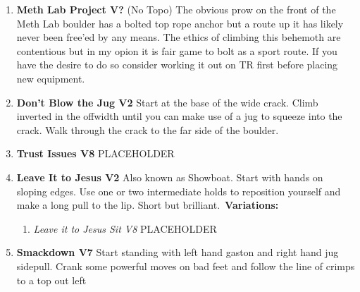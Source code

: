 \label{pt:Octurnal}
\begin{enumerate}[]
	\setcounter{enumi}{0}
	\item\label{rt:Meth Lab Project} \colorbox{black!20}{\textbf{Meth Lab Project V?  \warn \warn \warn } }
	\newline (No Topo) 
	\newline The obvious prow on the front of the Meth Lab boulder has a bolted top rope anchor but a route up it has likely never been free'ed by any means. The ethics of climbing this behemoth are contentious but in my opion it is fair game to bolt as a sport route. If you have the desire to do so consider working it out on TR first before placing new equipment.\
	\setcounter{enumi}{1}
	\item\label{rt:Don't Blow the Jug} \colorbox{green!20}{\textbf{Don't Blow the Jug V2    \warn } }
	\newline Start at the base of the wide crack. Climb inverted in the offwidth until you can make use of a jug to squeeze into the crack. Walk through the crack to the far side of the boulder.\
	\setcounter{enumi}{2}
	\item\label{rt:Trust Issues} \colorbox{Goldenrod!50}{\textbf{Trust Issues V8  \warn \warn } }
	\newline PLACEHOLDER\
	\setcounter{enumi}{3}
	\item\label{rt:Leave It to Jesus} \colorbox{green!20}{\textbf{Leave It to Jesus V2     } }
	\newline Also known as Showboat. Start with hands on sloping edges. Use one or two intermediate holds to reposition yourself and make a long pull to the lip. Short but brilliant.\
	\newline \textbf{Variations:}
	\begin{enumerate}
		\item\label{vr:Leave it to Jesus Sit} \colorbox{Goldenrod!50}{\emph{Leave it to Jesus Sit V8  }  }
		\newline PLACEHOLDER\
	\end{enumerate}
	\setcounter{enumi}{4}
	\item\label{rt:Smackdown} \colorbox{Goldenrod!50}{\textbf{Smackdown V7    } }
	\newline Start standing with left hand gaston and right hand jug sidepull. Crank some powerful moves on bad feet and follow the line of crimps to a top out left\

\end{enumerate}
